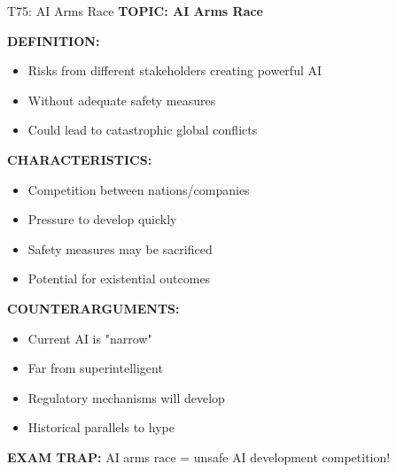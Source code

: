 \documentclass[8pt]{beamer}
\begin{document}
	\begin{frame}{T75: AI Arms Race}
		\fontsize{6.5}{7.5}\selectfont
		\textbf{TOPIC: AI Arms Race}
		
		\vspace{0.1cm}
		\textbf{DEFINITION:}
		\begin{itemize}
			\item Risks from different stakeholders creating powerful AI
			\item Without adequate safety measures
			\item Could lead to catastrophic global conflicts
		\end{itemize}
		
		\vspace{0.1cm}
		\textbf{CHARACTERISTICS:}
		\begin{itemize}
			\item Competition between nations/companies
			\item Pressure to develop quickly
			\item Safety measures may be sacrificed
			\item Potential for existential outcomes
		\end{itemize}
		
		\vspace{0.1cm}
		\textbf{COUNTERARGUMENTS:}
		\begin{itemize}
			\item Current AI is "narrow"
			\item Far from superintelligent
			\item Regulatory mechanisms will develop
			\item Historical parallels to hype
		\end{itemize}
		
		\textcolor{myred}{\textbf{EXAM TRAP:}} AI arms race = \textcolor{myblue}{unsafe AI development competition}!
	\end{frame}
	
\end{document}
